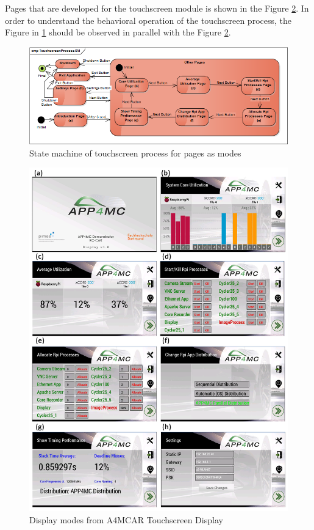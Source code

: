 Pages that are developed for the touchscreen module is shown in the Figure \ref{fig:displays}. In order to understand the behavioral operation of the touchscreen process, the Figure in \ref{fig:TouchscreenProcessSM} should be observed in parallel with the Figure \ref{fig:displays}. 
\begin{figure}[!ht]
	\includegraphics[scale=0.6]{content/images/TouchscreenProcessSM.png}
	\caption{State machine of touchscreen process for pages as modes}
	\label{fig:TouchscreenProcessSM}
\end{figure}
\begin{figure}[!ht]
	\includegraphics[scale=0.43]{content/images/displays.png}
	\caption{Display modes from A4MCAR Touchscreen Display}
	\label{fig:displays}
\end{figure}

